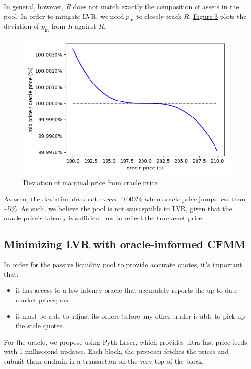 \documentclass{article}
\begin{document}
In general, however, $R$ does not match exactly the composition of assets in the pool. In order to mitigate LVR, we need $p_{\mathrm{m}}$ to closely track $R$. \hyperref[fig:3]{Figure 3} plots the deviation of $p_{\mathrm{m}}$ from $R$ against $R$.

\begin{figure}
  \centering
  \includegraphics[width=4.5in]{3-solidly-pool-price-vs-oracle.png}
  \caption{Deviation of marginal price from oracle price}
  \label{fig:3}
\end{figure}

As seen, the deviation does not exceed 0.003\% when oracle price jumps less than \textasciitilde 5\%. As such, we believe the pool is not ssusceptible to LVR, given that the oracle price's latency is sufficient low to reflect the true asset price.

\subsection{Minimizing LVR with oracle-imformed CFMM}

In order for the passive liquidity pool to provide accurate quotes, it's important that:

\begin{itemize}
  \item it has access to a low-latency oracle that accurately reports the up-to-date market prices; and,
  \item it must be able to adjust its orders before any other trader is able to pick up the stale quotes.
\end{itemize}

For the oracle, we propose using Pyth Laser,\supercite{pythlaser} which provides ultra fast price feeds with 1 millisecond updates. Each block, the proposer fetches the prices and submit them onchain in a transaction on the very top of the block.
\end{document}
